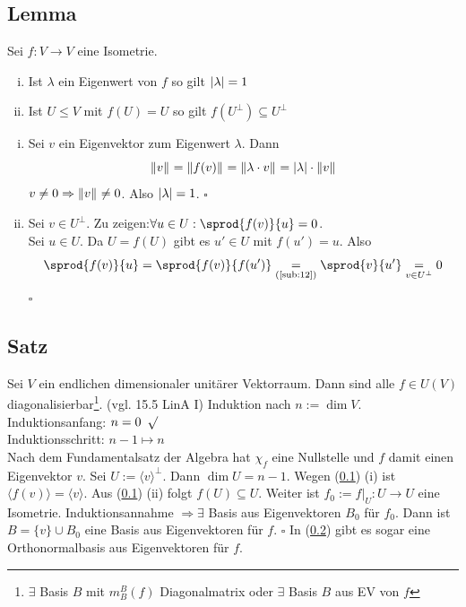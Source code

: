 \subsection[Lemma über die Eigenwerte einer Isometrie]{Lemma} %
\label{sub:112}
Sei $f : V \to V$ eine Isometrie.
\begin{enumerate}[(i)]
	\item Ist $\lambda $ ein Eigenwert von $f$ so gilt $\abs*{\lambda } = 1$ 
	\item Ist $U \le V$ mit $f(U)=U$ so gilt $f(U^\bot) \subseteq U^\bot$
\end{enumerate}
\begin{enumerate}[(i)]
	\item Sei $v$ ein Eigenvektor zum Eigenwert $\lambda $. Dann 
	\[
		\norm[]{v} = \norm[]{f(v)} = \norm[]{\lambda \cdot v} = \abs*{\lambda } \cdot \norm[]{v}    
	\]
	$v \not= 0 \Rightarrow \norm[]{v} \not= 0 $. Also $\abs*{\lambda } = 1 $. \hfill \( \square \)
	\item Sei $v \in U^\bot$. Zu zeigen:$\forall u \in U : \sprod{f(v)}{u} = 0$. \\
	Sei $u \in U$. Da $U=f(U)$ gibt es $u' \in U$ mit $f(u')=u$. Also 
	\[
		\sprod{f(v)}{u} = \sprod{f(v)}{f(u')} \underset{\text{(\ref{sub:12})}}{=} \sprod{v}{u'} \underset{v \in U^\bot}{=} 0
	\] 
	\hfill \( \square \)
	
\end{enumerate}

\subsection[Satz über die Diagonalisierbarkeit von Isometrien auf unitären Vektorräumen]{Satz} %
\label{sub:113}
Sei $V$ ein endlichen dimensionaler unitärer Vektorraum. Dann sind alle $f \in U(V)$ diagonalisierbar\footnote{$\exists$ Basis $B$ mit $m_B^B(f)$ Diagonalmatrix
oder $\exists$ Basis $B$ aus EV von $f$}.
{\footnotesize (vgl. 15.5 LinA I)} 
Induktion nach $n := \dim V$. Induktionsanfang: $n=0 \enspace\surd$ \\
Induktionsschritt: $n-1 \mapsto n$ \\
Nach dem Fundamentalsatz der Algebra hat $\chi_f$ eine Nullstelle und $f$ damit einen Eigenvektor $v$. Sei $U := \langle v\rangle^\bot$. Dann $\dim U = n-1$. Wegen 
(\ref{sub:112}) (i) ist$\langle f(v)\rangle = \langle v\rangle$. Aus (\ref{sub:112}) (ii) folgt $f(U) \subseteq U$. Weiter ist $f_0 := f|_{U}  : U \to U$ eine Isometrie. 
Induktionsannahme $\Rightarrow \exists$ Basis
aus Eigenvektoren $B_0$ für $f_0$. Dann ist $B=\{v\} \cup B_0$ eine Basis aus Eigenvektoren für $f$. \hfill \( \square \)
In (\ref{sub:113}) gibt es sogar eine Orthonormalbasis aus Eigenvektoren für $f$.

